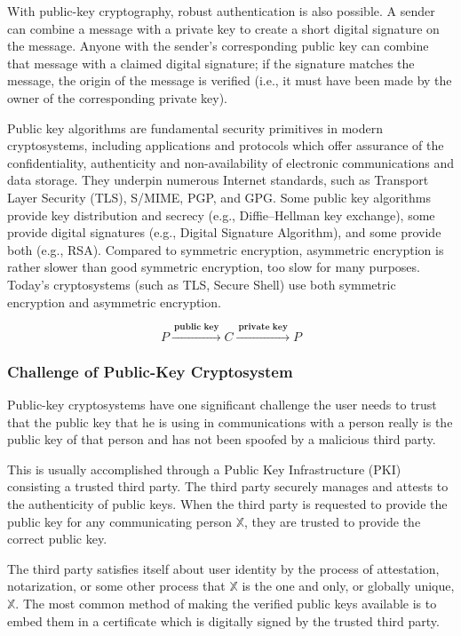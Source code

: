\documentclass[british]{article}
\begin{document}
With public-key cryptography, robust authentication is also possible.
A sender can combine a message with a private key to create a short
digital signature on the message. Anyone with the sender's corresponding
public key can combine that message with a claimed digital signature;
if the signature matches the message, the origin of the message is
verified (i.e., it must have been made by the owner of the corresponding
private key).

Public key algorithms are fundamental security primitives in modern
cryptosystems, including applications and protocols which offer assurance
of the confidentiality, authenticity and non-availability of electronic
communications and data storage. They underpin numerous Internet standards,
such as Transport Layer Security (TLS), S/MIME, PGP, and GPG. Some
public key algorithms provide key distribution and secrecy (e.g.,
Diffie--Hellman key exchange), some provide digital signatures (e.g.,
Digital Signature Algorithm), and some provide both (e.g., RSA). Compared
to symmetric encryption, asymmetric encryption is rather slower than
good symmetric encryption, too slow for many purposes. Today's cryptosystems
(such as TLS, Secure Shell) use both symmetric encryption and asymmetric
encryption.

\[
P\xrightarrow{\:\textbf{public key}\:}C\xrightarrow{\:\textbf{private key}\:}P
\]

\medskip{}


\subsubsection{Challenge of Public-Key Cryptosystem }

Public-key cryptosystems have one significant challenge \textminus{}
the user needs to trust that the public key that he is using in communications
with a person really is the public key of that person and has not
been spoofed by a malicious third party.

This is usually accomplished through a Public Key Infrastructure (PKI)
consisting a trusted third party. The third party securely manages
and attests to the authenticity of public keys. When the third party
is requested to provide the public key for any communicating person
$\mathbb{X}$, they are trusted to provide the correct public key.

The third party satisfies itself about user identity by the process
of attestation, notarization, or some other process \textminus{} that
$\mathbb{X}$ is the one and only, or globally unique, $\mathbb{X}$.
The most common method of making the verified public keys available
is to embed them in a certificate which is digitally signed by the
trusted third party.
\end{document}
